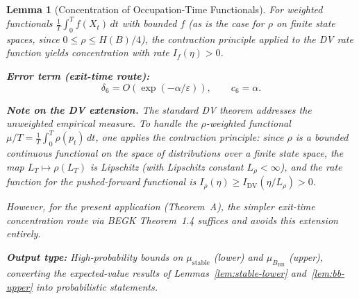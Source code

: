 \documentclass[11pt]{article}
\newtheorem{lemma}{Lemma}
\newcommand{\eps}{\varepsilon}
\newcommand{\BBB}{B_{\mathrm{BB}}}
\begin{document}
\begin{lemma}[Concentration of Occupation-Time Functionals]
For weighted functionals $\frac{1}{T}\int_0^T f(X_t)\, dt$ with
bounded $f$ (as is the case for $\rho$ on finite state spaces, since
$0 \leq \rho \leq H(B)/4$), the contraction principle applied to
the DV rate function yields concentration with rate $I_f(\eta) > 0$.

\medskip
\textbf{Error term (exit-time route):}
\begin{equation}\label{eq:delta6}
  \delta_6 = O(\exp(-\alpha/\eps)),
  \qquad c_6 = \alpha.
\end{equation}

\medskip
\textbf{Note on the DV extension.}
The standard DV theorem addresses the unweighted empirical measure.
To handle the $\rho$-weighted functional
$\mu/T = \frac{1}{T}\int_0^T \rho(p_t)\, dt$, one applies the
contraction principle: since $\rho$ is a bounded continuous functional
on the space of distributions over a finite state space, the map
$L_T \mapsto \rho(L_T)$ is Lipschitz (with Lipschitz constant
$L_\rho < \infty$), and the rate function for the pushed-forward
functional is
$I_\rho(\eta) \geq I_{\mathrm{DV}}(\eta / L_\rho) > 0$.

However, for the present application (Theorem~A), the simpler
exit-time concentration route via BEGK Theorem~1.4 suffices and
avoids this extension entirely.

\medskip
\textbf{Output type:}
High-probability bounds on $\mu_{\mathrm{stable}}$ (lower) and
$\mu_{\BBB}$ (upper), converting the expected-value results of
Lemmas~\ref{lem:stable-lower} and~\ref{lem:bb-upper} into
probabilistic statements.
\end{lemma}
\end{document}
